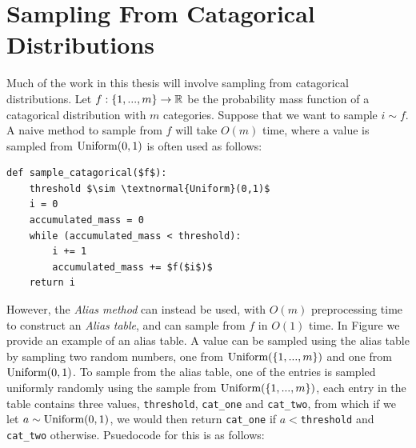 \section{Sampling From Catagorical Distributions}
\label{sec:2-6-sampling}






    Much of the work in this thesis will involve sampling from catagorical distributions. Let $f:\{1,...,m\}\rightarrow\mathbb{R}$ be the probability mass function of a catagorical distribution with $m$ categories. Suppose that we want to sample $i\sim f$. A naive method to sample from $f$ will take $O(m)$ time, where a value is sampled from $\textnormal{Uniform}(0,1)$ is often used as follows:

    \begin{lstlisting}
def sample_catagorical($f$):
    threshold $\sim \textnormal{Uniform}(0,1)$
    i = 0
    accumulated_mass = 0
    while (accumulated_mass < threshold):
        i += 1
        accumulated_mass += $f($i$)$
    return i
    \end{lstlisting}

    However, the \textit{Alias method}  can instead be used, with $O(m)$ preprocessing time to construct an \textit{Alias table}, and can sample from $f$ in $O(1)$ time. In Figure  we provide an example of an alias table. A value can be sampled using the alias table by sampling two random numbers, one from $\textnormal{Uniform}(\{1,...,m\})$ and one from $\textnormal{Uniform}(0,1)$. To sample from the alias table, one of the entries is sampled uniformly randomly using the sample from $\textnormal{Uniform}(\{1,...,m\})$, each entry in the table contains three values, \texttt{threshold}, \texttt{cat\_one} and \texttt{cat\_two}, from which if we let $a\sim\textnormal{Uniform}(0,1)$, we would then return \texttt{cat\_one} if $a<$\texttt{threshold} and \texttt{cat\_two} otherwise. Psuedocode for this is as follows:

